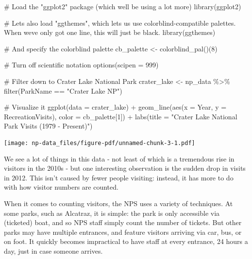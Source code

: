 \documentclass[
  letterpaper,
  DIV=11,
  numbers=noendperiod]{scrartcl}
\newenvironment{Shaded}{\begin{snugshade}}{\end{snugshade}}
\newcommand{\AttributeTok}[1]{\textcolor[rgb]{0.40,0.45,0.13}{#1}}
\newcommand{\CommentTok}[1]{\textcolor[rgb]{0.37,0.37,0.37}{#1}}
\newcommand{\DecValTok}[1]{\textcolor[rgb]{0.68,0.00,0.00}{#1}}
\newcommand{\FunctionTok}[1]{\textcolor[rgb]{0.28,0.35,0.67}{#1}}
\newcommand{\NormalTok}[1]{\textcolor[rgb]{0.00,0.23,0.31}{#1}}
\newcommand{\OtherTok}[1]{\textcolor[rgb]{0.00,0.23,0.31}{#1}}
\newcommand{\SpecialCharTok}[1]{\textcolor[rgb]{0.37,0.37,0.37}{#1}}
\newcommand{\StringTok}[1]{\textcolor[rgb]{0.13,0.47,0.30}{#1}}
\begin{document}
\begin{Shaded}
\begin{Highlighting}[]
\CommentTok{\# Load the "ggplot2" package (which we\textquotesingle{}ll be using a lot more)}
\FunctionTok{library}\NormalTok{(ggplot2)}

\CommentTok{\# Let\textquotesingle{}s also load "ggthemes", which let\textquotesingle{}s us use colorblind{-}compatible palettes. When we\textquotesingle{}ve only got one line, this will just be black.}
\FunctionTok{library}\NormalTok{(ggthemes)}

\CommentTok{\# And specify the colorblind palette}
\NormalTok{cb\_palette }\OtherTok{\textless{}{-}} \FunctionTok{colorblind\_pal}\NormalTok{()(}\DecValTok{8}\NormalTok{)}

\CommentTok{\# Turn off scientific notation}
\FunctionTok{options}\NormalTok{(}\AttributeTok{scipen =} \DecValTok{999}\NormalTok{)}

\CommentTok{\# Filter down to Crater Lake National Park}
\NormalTok{crater\_lake }\OtherTok{\textless{}{-}}\NormalTok{ np\_data }\SpecialCharTok{\%\textgreater{}\%} \FunctionTok{filter}\NormalTok{(ParkName }\SpecialCharTok{==} \StringTok{"Crater Lake NP"}\NormalTok{)}

\CommentTok{\# Visualize it}
\FunctionTok{ggplot}\NormalTok{(}\AttributeTok{data =}\NormalTok{ crater\_lake) }\SpecialCharTok{+} 
  \FunctionTok{geom\_line}\NormalTok{(}\FunctionTok{aes}\NormalTok{(}\AttributeTok{x =} 
\NormalTok{  Year, }\AttributeTok{y =}\NormalTok{ RecreationVisits), }
  \AttributeTok{color =}\NormalTok{ cb\_palette[}\DecValTok{1}\NormalTok{]) }\SpecialCharTok{+}
  \FunctionTok{labs}\NormalTok{(}\AttributeTok{title =} \StringTok{"Crater Lake National Park Visits (1979 {-} Present)"}\NormalTok{)}
\end{Highlighting}
\end{Shaded}

\texttt{[image: np-data\_files/figure-pdf/unnamed-chunk-3-1.pdf]}

We see a lot of things in this data - not least of which is a tremendous
rise in visitors in the 2010s - but one interesting observation is the
sudden drop in visits in 2012. This isn't caused by fewer people
visiting: instead, it has more to do with how visitor numbers are
counted.

When it comes to counting visitors, the NPS uses a variety of
techniques. At some parks, such as Alcatraz, it is simple: the park is
only accessible via (ticketed) boat, and so NPS staff simply count the
number of tickets. But other parks may have multiple entrances, and
feature visitors arriving via car, bus, or on foot. It quickly becomes
impractical to have staff at every entrance, 24 hours a day, just in
case someone arrives.
\end{document}
